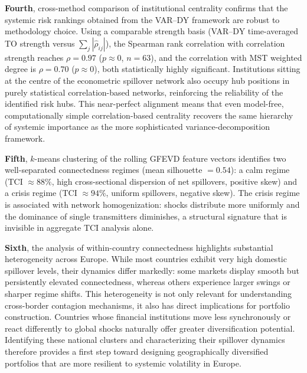 \textbf{Fourth}, cross-method comparison of institutional centrality confirms that the
systemic risk rankings obtained from the VAR--DY framework are robust to methodology
choice. Using a comparable strength basis (VAR--DY time-averaged TO strength versus $\sum_j|\hat\rho_{ij}|$),
the Spearman rank correlation with correlation strength reaches $\rho = 0.97$ ($p \approx 0$,
$n = 63$), and the correlation with MST weighted degree is $\rho = 0.70$ ($p \approx 0$),
both statistically highly significant. Institutions sitting at the centre of the econometric
spillover network also occupy hub positions in purely statistical correlation-based networks,
reinforcing the reliability of the identified risk hubs. This near-perfect alignment means
that even model-free, computationally simple correlation-based centrality recovers the same
hierarchy of systemic importance as the more sophisticated variance-decomposition framework.

\textbf{Fifth}, $k$-means clustering of the rolling GFEVD feature vectors identifies
two well-separated connectedness regimes (mean silhouette $= 0.54$): a calm regime
(TCI $\approx 88\%$, high cross-sectional dispersion of net spillovers, positive skew)
and a crisis regime (TCI $\approx 94\%$, uniform spillovers, negative skew). The crisis
regime is associated with network homogenization: shocks distribute more uniformly and
the dominance of single transmitters diminishes, a structural signature that is
invisible in aggregate TCI analysis alone.

\textbf{Sixth}, the analysis of within-country connectedness highlights substantial heterogeneity
across Europe. While most countries exhibit very high domestic spillover levels, their
dynamics differ markedly: some markets display smooth but persistently elevated
connectedness, whereas others experience larger swings or sharper regime shifts. This
heterogeneity is not only relevant for understanding cross-border contagion mechanisms,
it also has direct implications for portfolio construction. Countries whose financial
institutions move less synchronously or react differently to global shocks naturally offer
greater diversification potential. Identifying these national clusters and characterizing
their spillover dynamics therefore provides a first step toward designing geographically
diversified portfolios that are more resilient to systemic volatility in Europe.

